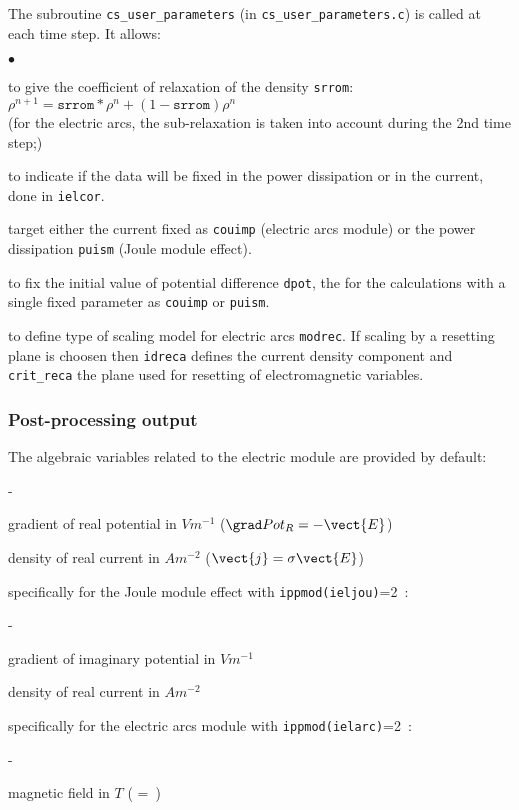 {{{The subroutine \texttt{cs\_user\_parameters} (in \texttt{cs\_user\_parameters.c})
 is called at each time step. It allows:
\begin{list}{$\bullet$}{}
\item to give the coefficient of relaxation of the density \texttt{srrom}:\\
$\rho^{n+1}=\texttt{srrom}*\rho^{n}+(1-\texttt{srrom})\rho^{n}$\\
(for the electric arcs, the sub-relaxation is taken into account during the 2nd time
 step;)

\item to indicate if the data will be fixed in the power dissipation or
 in the current, done in \texttt{ielcor}.
\item target either the current fixed as \texttt{couimp} (electric arcs module)
 or the power dissipation \texttt{puism} (Joule module effect).
\item to fix the initial value of potential difference \texttt{dpot},
 the for the calculations with a single fixed parameter as \texttt{couimp}
 or \texttt{puism}.
\item to define type of scaling model for electric arcs \texttt{modrec}. If scaling
by a resetting plane is choosen then \texttt{idreca} defines the current density component
and \texttt{crit\_reca} the plane used for resetting of electromagnetic variables.
\end{list}

\subsubsection[{\em EnSight} output]
{Post-processing output}

The algebraic variables related to the electric module are provided by default:
\begin{list}{-}{}
\item gradient of real potential in $V m^{-1}$ ($\grad Pot_R = -\vect{E}$)
\item density of real current in $A m^{-2}$  ($\vect{j}=\sigma \vect{E}$)
\end{list}
specifically for the Joule module effect with \texttt{ippmod(ieljou)}=2~:
\begin{list}{-}{}
\item gradient of imaginary potential in $V m^{-1}$
\item density of real current in $A m^{-2}$
\end{list}
specifically for the electric arcs module with \texttt{ippmod(ielarc)}=2~:
\begin{list}{-}{}
\item magnetic field in $T$ ( = \,)
\end{list}

}}}
